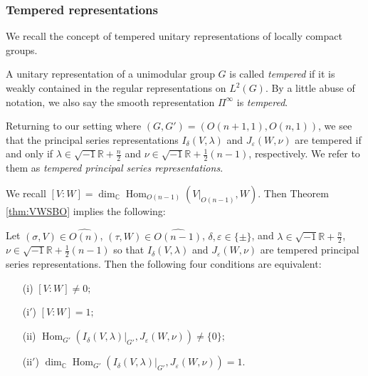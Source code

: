\subsubsection{Tempered representations}
\label{subsec:SBtemp}
We recall the concept of tempered unitary representations
 of locally compact groups.  
\begin{definition}
\label{def:tempered}
A unitary representation of a unimodular group $G$ is called 
{\it{tempered}}
 if it is weakly contained
 in the regular representations 
 on $L^2(G)$.  
By a little abuse of notation, 
 we also say the smooth representation 
 $\Pi^{\infty}$
 is {\it{tempered}}.  
\end{definition}
Returning to our setting 
 where $(G,G')=(O(n+1,1), O(n,1))$, 
 we see that the principal series representations $I_\delta (V,\lambda)$ and $J_\varepsilon (W,\nu)$ are tempered
 if and only if $\lambda \in \sqrt{-1}{\mathbb{R}}+\frac n 2$ and $\nu \in \sqrt{-1}{\mathbb{R}}+\frac 1 2 (n-1)$, 
 respectively.  
We refer to them as {\it{tempered principal series representations}}.  



We recall 
$
   [V:W]=\dim_{\mathbb{C}} {\operatorname{Hom}}_{O(n-1)}(V|_{O(n-1)}, W).
$
Then Theorem \ref{thm:VWSBO} implies the following:
\begin{theorem}
\label{thm:tempVW}
Let $(\sigma, V) \in \widehat {O(n)}$, 
 $(\tau, W) \in \widehat {O(n-1)}$, 
 $\delta, \varepsilon \in \{\pm\}$, 
 and $\lambda \in \sqrt{-1}{\mathbb{R}}+\frac n 2$, 
 $\nu \in \sqrt{-1}{\mathbb{R}}+\frac 1 2(n-1)$
 so that $I_\delta(V,\lambda)$ and $J_\varepsilon(W,\nu)$ are tempered principal series representations. 
Then the following four conditions are equivalent:
\begin{enumerate}
\item
[{\rm{(i)}}]
$[V:W] \ne 0;$
\item
[{\rm{(i$'$)}}]
$[V:W] = 1;$
\item
[{\rm{(ii)}}]
$
 {\operatorname{Hom}}_{G'}
 (I_\delta(V,\lambda)|_{G'}, J_\varepsilon(W,\nu))\not = \{0\};
$
\item
[{\rm{(ii$'$)}}]
$
\dim_{\mathbb{C}} {\operatorname{Hom}}_{G'}(I_\delta(V,\lambda)|_{G'}, J_\varepsilon(W,\nu)) =1.  
$
\end{enumerate}
\end{theorem}



